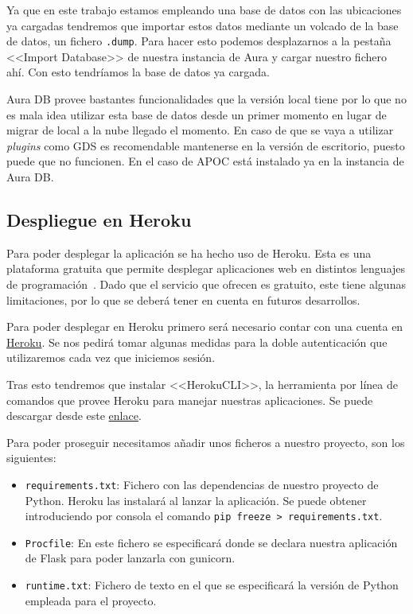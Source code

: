 
Ya que en este trabajo estamos empleando una base de datos con las ubicaciones ya cargadas tendremos que importar estos datos mediante un volcado de la base de datos, un fichero \texttt{.dump}. Para hacer esto podemos desplazarnos a la pestaña <<Import Database>> de nuestra instancia de Aura y cargar nuestro fichero ahí. Con esto tendríamos la base de datos ya cargada.


Aura DB provee bastantes funcionalidades que la versión local tiene por lo que no es mala idea utilizar esta base de datos desde un primer momento en lugar de migrar de local a la nube llegado el momento. En caso de que se vaya a utilizar \textit{plugins} como GDS es recomendable mantenerse en la versión de escritorio, puesto puede que no funcionen. En el caso de APOC está instalado ya en la instancia de Aura DB.

\subsection{Despliegue en Heroku}

Para poder desplegar la aplicación se ha hecho uso de Heroku. Esta es una plataforma gratuita que permite desplegar aplicaciones web en distintos lenguajes de programación~\cite{herokuCloudApplication}. Dado que el servicio que ofrecen es gratuito, este tiene algunas limitaciones, por lo que se deberá tener en cuenta en futuros desarrollos.

Para poder desplegar en Heroku primero será necesario contar con una cuenta en \href{https://signup.heroku.com/}{Heroku}. Se nos pedirá tomar algunas medidas para la doble autenticación que utilizaremos cada vez que iniciemos sesión.

Tras esto tendremos que instalar <<HerokuCLI>>, la herramienta por línea de comandos que provee Heroku para manejar nuestras aplicaciones. Se puede descargar desde este \href{https://devcenter.heroku.com/articles/heroku-cli#install-the-heroku-cli}{enlace}.

Para poder proseguir necesitamos añadir unos ficheros a nuestro proyecto, son los siguientes:
\begin{itemize}
	\item \texttt{requirements.txt}: Fichero con las dependencias de nuestro proyecto de Python. Heroku las instalará al lanzar la aplicación. Se puede obtener introduciendo por consola el comando \texttt{pip freeze > requirements.txt}.
	\item \texttt{Procfile}: En este fichero se especificará donde se declara nuestra aplicación de Flask para poder lanzarla con gunicorn.
	\item \texttt{runtime.txt}: Fichero de texto en el que se especificará la versión de Python empleada para el proyecto.
\end{itemize}

